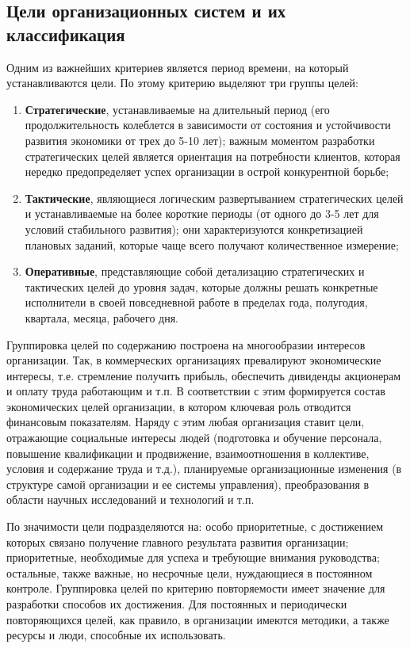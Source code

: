 \documentclass[a4paper,12pt,oneside,final]{extarticle}
\numberwithin{equation}{section}
\begin{document}
\subsection{Цели организационных систем и их классификация}
Одним из важнейших критериев является период времени, на который устанавливаются цели. 
По этому критерию выделяют три группы целей:
\begin{enumerate}
	\item \textbf{Стратегические}, устанавливаемые на длительный период (его продолжительность колеблется в зависимости от состояния и ус­тойчивости развития экономики от трех до 5-10 лет); важным моментом разработки стратегических целей является ориентация на потребности клиентов, которая нередко предопределяет успех организации в острой конкурентной борьбе;
	\item \textbf{Тактические}, являющиеся логическим развертыванием стра­тегических целей и устанавливаемые на более короткие периоды (от одного до 3-5 лет для условий стабильного развития); они характеризуются конкретизацией плановых заданий, которые чаще всего получают количественное измерение;
	\item \textbf{Оперативные}, представляющие собой детализацию стратегических и тактических целей до уровня задач, которые должны решать конкретные исполнители в своей повседневной работе в пределах года, полугодия, квартала, месяца, рабочего дня.
\end{enumerate}

Группировка целей по содержанию построена на многообразии интересов организации. 
Так, в коммерческих организациях превалируют экономические интересы, т.е. стремление получить прибыль, обеспечить дивиденды акционерам и оплату труда работающим и т.п. 
В соответствии с этим формируется состав экономиче­ских целей организации, в котором ключевая роль отводится финансовым показателям. 
Наряду с этим любая организация ставит цели, отражающие социальные интересы людей (подготовка и обучение персонала, повышение квалификации и продвижение, взаимоотношения в коллективе, условия и содержание труда и т.д.), планируемые организационные изменения (в структуре самой организации и ее системы управления), преобразования в области научных исследований и технологий и т.п.

По значимости цели подразделяются на: особо приоритетные, с достижением которых связано получение главного результата развития организации; приоритетные, необходимые для успеха и требующие внимания руководства; остальные, также важные, но несрочные цели, нуждающиеся в постоянном контроле.
Группировка целей по критерию повторяемости имеет значение для разработки способов их достижения. 
Для постоянных и периоди­чески повторяющихся целей, как правило, в организации имеются методики, а также ресурсы и люди, способные их использовать.
\end{document}

